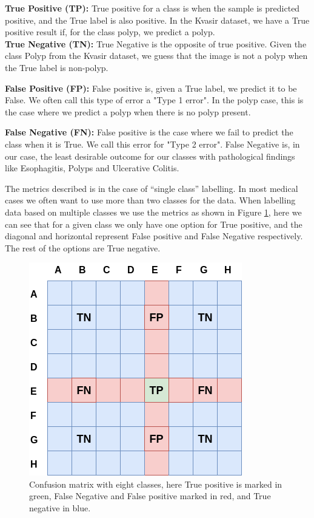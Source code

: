 \textbf{True Positive (TP): } True positive for a class is when the sample is predicted positive, and the True label is also positive.  In the Kvasir dataset, we have a True positive result if, for the class polyp, we predict a polyp.\\

\textbf{True Negative (TN): } True Negative is the opposite of true positive. Given the class Polyp from the Kvasir dataset, we guess that the image is not a polyp when the True label is non-polyp. 

\textbf{False Positive (FP): } False positive is, given a True label, we predict it to be False. We often call this type of error a "Type 1 error".   In the polyp case, this is the case where we predict a polyp when there is no polyp present.

\textbf{False Negative (FN): } False positive is the case where we fail to predict the class when it is True. We call this error for "Type 2 error". False Negative is, in our case, the least desirable outcome for our classes with pathological findings like Esophagitis, Polyps and Ulcerative Colitis.

\vspace{5px}
The metrics described is in the case of ``single class'' labelling. In most medical cases we often want to use more than two classes for the data. 
When labelling data based on multiple classes we use the metrics as shown in Figure \ref{fig:confusionmatrix_labels}, here we can see that for a given class we only have one option for True positive, and the diagonal and horizontal represent False positive and False Negative respectively. The rest of the options are True negative. 
\begin{figure}[h]
\centering
\includegraphics[scale=0.7]{experiments/figures/confusionmatrix.png}
\caption{
Confusion matrix with eight classes, here True positive is marked in green, False Negative and False positive marked in red, and True negative in blue.
}
\label{fig:confusionmatrix_labels}
\end{figure}


